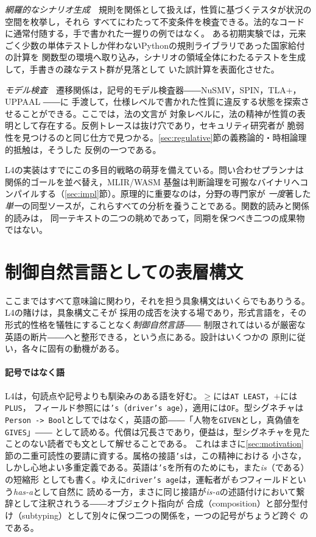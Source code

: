 \documentclass[11pt,a4paper]{ltjsarticle}
\newcommand{\code}[1]{\texttt{\small #1}}
\begin{document}
\emph{網羅的なシナリオ生成}　規則を関係として扱えば，性質に基づくテスタが状況の空間を枚挙し，それら
すべてにわたって不変条件を検査できる。法的なコードに通常付随する，手で書かれた一握りの例ではなく。
ある初期実験では，元来ごく少数の単体テストしか伴わないPythonの規則ライブラリであった国家給付の計算を
関数型の環境へ取り込み，シナリオの領域全体にわたるテストを生成して，手書きの疎なテスト群が見落として
いた誤計算を表面化させた。

\emph{モデル検査}　遷移関係は，記号的モデル検査器――NuSMV，SPIN，TLA+，UPPAAL
\cite{cimatti2002nusmv,holzmann1997spin,lamport2002specifying,behrmann2004uppaal}――に
手渡して，仕様レベルで書かれた性質に違反する状態を探索させることができる。ここでは，法の文言が
対象レベルに，法の精神が性質の表明として存在する。反例トレースは抜け穴であり，セキュリティ研究者が
脆弱性を見つけるのと同じ仕方で見つかる。\ref{sec:regulative}節の義務論的・時相論理的抵触は，そうした
反例の一つである。

L4の実装はすでにこの多目的戦略の萌芽を備えている。問い合わせプランナは関係的ゴールを並べ替え，MLIR/WASM
基盤は判断論理を可搬なバイナリへコンパイルする（\ref{sec:impl}節）。原理的に重要なのは，分野の専門家が
\emph{一度}著した\emph{単一}の同型ソースが，これらすべての分析を養うことである。関数的読みと関係的読みは，
同一テキストの二つの眺めであって，同期を保つべき二つの成果物ではない。

\section{制御自然言語としての表層構文}\label{sec:cnl}
ここまではすべて意味論に関わり，それを担う具象構文はいくらでもありうる。L4の賭けは，具象構文こそが
採用の成否を決する場であり，形式言語を，その形式的性格を犠牲にすることなく\emph{制御自然言語}――
制限されてはいるが厳密な英語の断片\cite{kuhn2014cnl}――へと整形できる，という点にある。設計はいくつかの
原則に従い，各々に固有の動機がある。

\paragraph{記号ではなく語}
L4は，句読点や記号よりも馴染みのある語を好む。$\geq$には\code{AT LEAST}，$+$には\code{PLUS}，
フィールド参照には\code{'s}（\code{driver's age}），適用には\code{OF}。型シグネチャは
\code{Person -> Bool}としてではなく，英語の節――「人物を\code{GIVEN}とし，真偽値を\code{GIVES}」――
として読める。代償は冗長さであり，便益は，型シグネチャを見たことのない読者でも文として解せることである。
これはまさに\ref{sec:motivation}節の二重可読性の要請に資する。属格の接語\code{'s}は，この精神における
小さな，しかし心地よい多重定義である。英語は\code{'s}を所有のためにも，また\emph{is}（である）の短縮形
としても書く。ゆえに\code{driver's age}は，運転者が\emph{もつ}フィールドという\emph{has-a}として自然に
読める一方，まさに同じ接語が\emph{is-a}の述語付けにおいて繋辞として注釈されうる――オブジェクト指向が
合成（composition）と部分型付け（subtyping）として別々に保つ二つの関係を，一つの記号がちょうど跨ぐ
のである。
\end{document}
